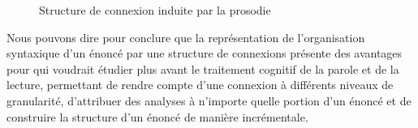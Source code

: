 {    \begin{figure}[H]
    \caption{Structure de connexion induite par la prosodie}
    \label{fig:rencontre}
    \end{figure}

    Nous pouvons dire pour conclure que la représentation de l’organisation syntaxique d’un énoncé par une structure de connexions présente des avantages pour qui voudrait étudier plus avant le traitement cognitif de la parole et de la lecture, permettant de rendre compte d’une connexion à différents niveaux de granularité, d’attribuer des analyses à n’importe quelle portion d’un énoncé et de construire la structure d’un énoncé de manière incrémentale.
}
